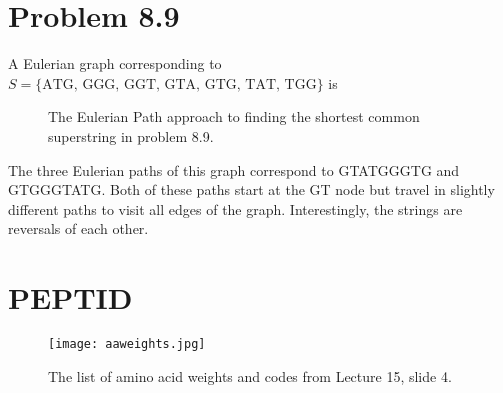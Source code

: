\documentclass[12pt]{article}
\begin{document}
\section{Problem 8.9}
A Eulerian graph corresponding to $S=\{\text{ATG, GGG, GGT, GTA, GTG, TAT, TGG}\}$ is 

\begin{figure}[h]
\centering
{}
\caption{The Eulerian Path approach to finding the shortest common superstring in problem 8.9.}
\label{eulerpath2}
\end{figure}

The three Eulerian paths of this graph correspond to GTATGGGTG and GTGGGTATG.  Both of these paths start at the GT node but travel in slightly different paths to visit all edges of the graph.  Interestingly, the strings are reversals of each other.

\clearpage
\section{PEPTID}

\begin{figure}[h]
\begin{center}
\texttt{[image: aaweights.jpg]}
\end{center}
\caption{The list of amino acid weights and codes from Lecture 15, slide 4.}
\label{aaweights}
\end{figure}
\end{document}
